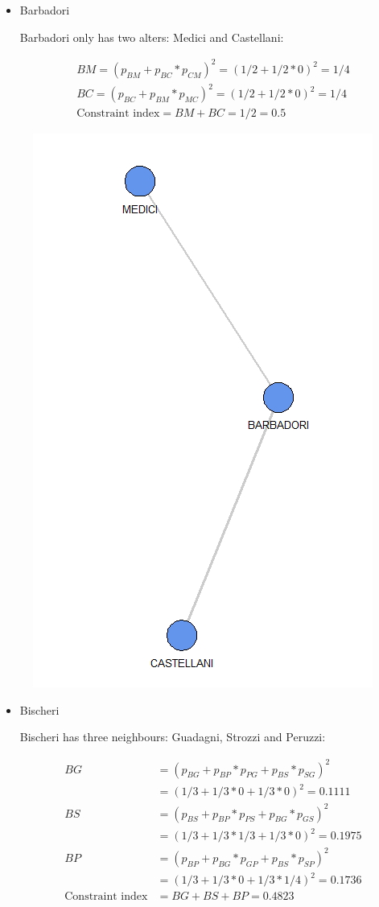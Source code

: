 \documentclass[
  notitlepage,
  onecolumn,
  openany]{book}
\begin{document}
\begin{itemize}
\item
  Barbadori

  Barbadori only has two alters: Medici and Castellani:

  \[
    \begin{aligned}
    BM = (p_{BM}+p_{BC}*p_{CM})^2 = (1/2+1/2*0)^2 = 1/4 \\
    BC = (p_{BC}+p_{BM}*p_{MC})^2 = (1/2+1/2*0)^2 = 1/4\\
    \text{Constraint index} = BM+BC = 1/2 = 0.5
    \end{aligned}
    \]
\end{itemize}

\begin{figure}[h!]

{\centering \includegraphics[width=0.3\linewidth]{images/08-Metrics for structural holes/Untitled 5} 

}

\end{figure}

\begin{itemize}
\item
  Bischeri

  Bischeri has three neighbours: Guadagni, Strozzi and Peruzzi:

  \[
    \begin{aligned}
    BG &= (p_{BG}+p_{BP}*p_{PG}+p_{BS}*p_{SG})^2\\
    &=(1/3+1/3*0+1/3*0)^2 = 0.1111\\
    BS &= (p_{BS}+p_{BP}*p_{PS}+p_{BG}*p_{GS})^2\\
    &= (1/3+1/3*1/3+1/3*0)^2 = 0.1975\\
    BP &= (p_{BP}+p_{BG}*p_{GP}+p_{BS}*p_{SP})^2 \\&= (1/3+1/3*0+1/3*1/4)^2 = 0.1736\\
    \text{Constraint index} &= BG+BS+BP = 0.4823
    \end{aligned}
    \]
\end{itemize}
\end{document}
